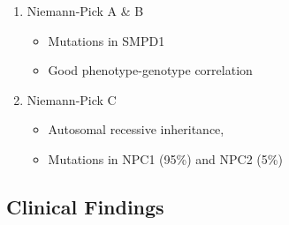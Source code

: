 \documentclass{scrartcl}
\begin{document}
\begin{enumerate}
\begin{enumerate}
\item Niemann-Pick A \& B
\label{sec:org788bd22}
\begin{itemize}
\item Mutations in SMPD1
\item Good phenotype-genotype correlation
\end{itemize}
\item Niemann-Pick C
\label{sec:orga0d487d}
\begin{itemize}
\item Autosomal recessive inheritance,
\item Mutations in NPC1 (95\%) and NPC2 (5\%)
\end{itemize}
\end{enumerate}
\end{enumerate}

\subsection{Clinical Findings}
\label{sec:orgc83281c}
\end{document}
